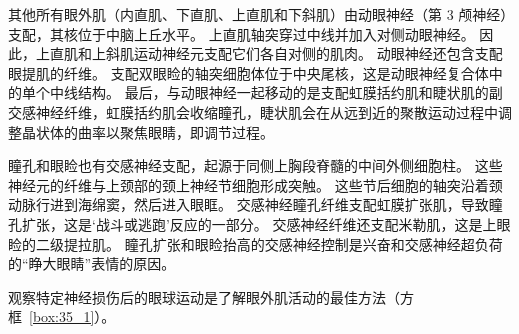 其他所有眼外肌（内直肌、下直肌、上直肌和下斜肌）由动眼神经（第 3 颅神经）支配，其核位于中脑上丘水平。
上直肌轴突穿过中线并加入对侧动眼神经。
因此，上直肌和上斜肌运动神经元支配它们各自对侧的肌肉。
动眼神经还包含支配眼提肌的纤维。
支配双眼睑的轴突细胞体位于中央尾核，这是动眼神经复合体中的单个中线结构。
最后，与动眼神经一起移动的是支配虹膜括约肌和睫状肌的副交感神经纤维，虹膜括约肌会收缩瞳孔，睫状肌会在从远到近的聚散运动过程中调整晶状体的曲率以聚焦眼睛，即调节过程。


瞳孔和眼睑也有交感神经支配，起源于同侧上胸段脊髓的中间外侧细胞柱。
这些神经元的纤维与上颈部的颈上神经节细胞形成突触。
这些节后细胞的轴突沿着颈动脉行进到海绵窦，然后进入眼眶。
交感神经瞳孔纤维支配虹膜扩张肌，导致瞳孔扩张，这是‘战斗或逃跑’反应的一部分。
交感神经纤维还支配米勒肌，这是上眼睑的二级提拉肌。
瞳孔扩张和眼睑抬高的交感神经控制是兴奋和交感神经超负荷的“睁大眼睛”表情的原因。



观察特定神经损伤后的眼球运动是了解眼外肌活动的最佳方法（方框~\ref{box:35_1}）。


